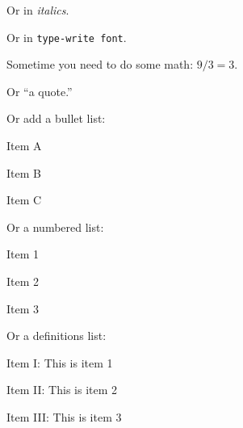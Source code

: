 \documentclass[11pt,twocolumn,letterpaper]{article}
\begin{document}
\noindent
Or in {\em italics}.

\noindent
Or in \texttt{type-write font}.

\noindent
Sometime you need to do some math: $9/3=3$.

\noindent
Or ``a quote.''

\noindent
Or add a bullet list:

\begin{packed_item}
\item Item A
\item Item B
\item Item C
\end{packed_item}

\noindent
Or a numbered list:

\begin{packed_enum}
\item Item 1
\item Item 2
\item Item 3
\end{packed_enum}

\noindent
Or a definitions list:

\begin{packed_desc}
\item[Item I:] This is item 1 
\item[Item II:] This is item 2
\item[Item III:] This is item 3
\end{packed_desc}




\end{document}
